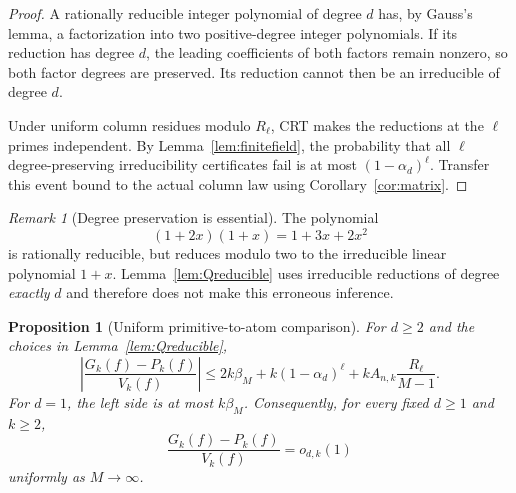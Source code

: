 \documentclass[11pt]{amsart}
\newtheorem{proposition}[theorem]{Proposition}
\theoremstyle{definition}
\theoremstyle{remark}
\newtheorem{remark}[theorem]{Remark}
\begin{document}
\begin{proof}
A rationally reducible integer polynomial of degree $d$ has, by Gauss's
lemma, a factorization into two positive-degree integer polynomials.
If its reduction has degree $d$, the leading coefficients of both
factors remain nonzero, so both factor degrees are preserved. Its
reduction cannot then be an irreducible of degree $d$.

Under uniform column residues modulo $R_\ell$, CRT makes the reductions
at the $\ell$ primes independent. By Lemma~\ref{lem:finitefield},
the probability that all $\ell$ degree-preserving irreducibility
certificates fail is at most $(1-\alpha_d)^\ell$. Transfer this event
bound to the actual column law using Corollary~\ref{cor:matrix}.
\end{proof}

\begin{remark}[Degree preservation is essential]\label{rem:degree}
The polynomial
\[
(1+2x)(1+x)=1+3x+2x^2
\]
is rationally reducible, but reduces modulo two to the irreducible
linear polynomial $1+x$. Lemma~\ref{lem:Qreducible} uses irreducible
reductions of degree \emph{exactly} $d$ and therefore does not make
this erroneous inference.
\end{remark}

\begin{proposition}[Uniform primitive-to-atom comparison]\label{prop:comparison}
For $d\ge2$ and the choices in Lemma~\ref{lem:Qreducible},
\begin{equation}\label{eq:atomerror}
\left|\frac{G_k(f)-P_k(f)}{V_k(f)}\right|
\le2k\beta_M+k(1-\alpha_d)^\ell
+kA_{n,k}\frac{R_\ell}{M-1}.
\end{equation}
For $d=1$, the left side is at most $k\beta_M$.
Consequently, for every fixed $d\ge1$ and $k\ge2$,
\begin{equation}\label{eq:atomprimitive}
\frac{G_k(f)-P_k(f)}{V_k(f)}=o_{d,k}(1)
\end{equation}
uniformly as $M\to\infty$.
\end{proposition}
\end{document}
